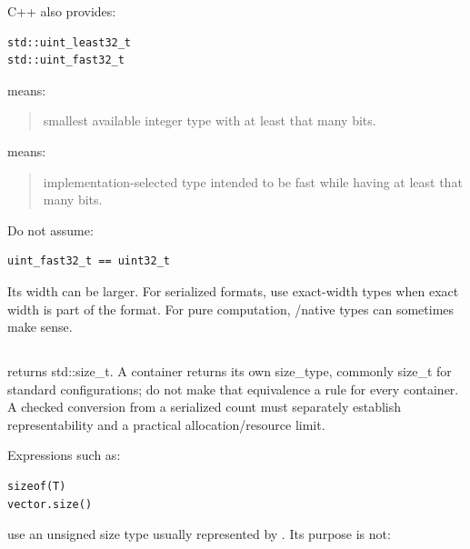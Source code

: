 \hypertarget{05-engine-i-ch002-least-and-fast}{}

C++ also provides:

\begin{verbatim}
std::uint_least32_t
std::uint_fast32_t
\end{verbatim}

 means:

\begin{quote}
smallest available integer type with at least that many bits.
\end{quote}

 means:

\begin{quote}
implementation-selected type intended to be fast while having at least that many bits.
\end{quote}

Do not assume:

\begin{verbatim}
uint_fast32_t == uint32_t
\end{verbatim}

Its width can be larger. For serialized formats, use exact-width types when exact width is part of the format. For pure computation, /native types can sometimes make sense.

\subsection{\texorpdfstring{}{}}\label{05-engine-i-ch002-stdsize_t}

\hypertarget{05-engine-i-ch002-stdsize_t}{}

 returns std::size\_t. A container returns its own size\_type, commonly size\_t for standard configurations; do not make that equivalence a rule for every container. A checked conversion from a serialized count must separately establish representability and a practical allocation/resource limit.

Expressions such as:

\begin{verbatim}
sizeof(T)
vector.size()
\end{verbatim}

use an unsigned size type usually represented by . Its purpose is not:

